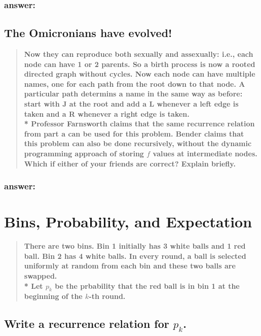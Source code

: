 \documentclass[titlepage]{article}\usepackage[]{graphicx}\usepackage[]{color}
\theoremstyle{definition}
\begin{document}
\subsubsection{answer:}
\vspace{5cm}



\subsection{The Omicronians have evolved!} 
\begin{quote}
  \textbf{Now they can reproduce both sexually
	and assexually: i.e., each node can have 1 or 2 parents. So a birth process
	is now a rooted directed graph without cycles. Now each node can have
	multiple names, one for each path from the root down to that node. A
	particular path determins a name in the same way as before: start with J at
	the root and add a L whenever a left edge is taken and a R whenever a right
	edge is taken. \\*
	Professor Farnsworth claims that the same recurrence relation from part a
	can be used for this problem. Bender claims that this problem can also be
	done recursively, without the dynamic programming approach of storing $f$
	values at intermediate nodes. Which if either of your friends are correct?
	Explain briefly.}
\end{quote}
\subsubsection{answer: }
\vspace{8cm}





\section{Bins, Probability, and Expectation}
\begin{quote}
  \textbf{There are two bins. Bin 1 initially has 3 white balls and 1 red ball.
  Bin 2 has 4 white balls. In every round, a ball is selected uniformly at
  random from each bin and these two balls are swapped. \\*
  Let $p_k$ be the prbability that the red ball is in bin 1 at the beginning of
  the $k$-th round.}
\end{quote}

\subsection{ Write a recurrence relation for $p_k$. }
\end{document}

